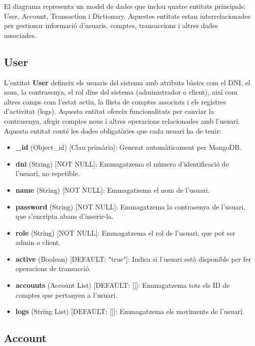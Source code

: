 \documentclass[a4paper,12pt,twoside]{ThesisStyle}
\begin{document}
El diagrama representa un model de dades que inclou quatre entitats principals: User, Account, Transaction i Dictionary. Aquestes entitats estan interrelacionades per gestionar informació d'usuaris, comptes, transaccions i altres dades associades.

\subsection{User}
\label{subsec: User}


L'entitat \textbf{User} defineix els usuaris del sistema amb atributs bàsics com el DNI, el nom, la contrasenya, el rol dins del sistema (administrador o client), així com altres camps com l'estat actiu, la llista de comptes associats i els registres d'activitat (logs). Aquesta entitat ofereix funcionalitats per canviar la contrasenya, afegir comptes nous i altres operacions relacionades amb l'usuari.\\

Aquesta entitat conté les dades obligatòries que cada usuari ha de tenir:

\begin{itemize}
    \item \textbf{\_id} (Object\_id) [Clau primària]: Generat automàticament per MongoDB.
    \item \textbf{dni} (String) [NOT NULL]: Emmagatzema el número d'identificació de l'usuari, no repetible.
    \item \textbf{name} (String) [NOT NULL]: Emmagatzema el nom de l'usuari.
    \item \textbf{password} (String) [NOT NULL]: Emmagatzema la contrasenya de l'usuari, que s'encripta abans d'inserir-la.
    \item \textbf{role} (String) [NOT NULL]: Emmagatzema el rol de l'usuari, que pot ser admin o client.
    \item \textbf{active} (Boolean) [DEFAULT: "true"]: Indica si l'usuari està disponible per fer operacions de transacció.
    \item \textbf{accounts} (Account List) [DEFAULT: []]: Emmagatzema tots els ID de comptes que pertanyen a l'usuari.
    \item \textbf{logs} (String List) [DEFAULT: []]: Emmagatzema els moviments de l'usuari.
\end{itemize}


\subsection{Account}
\label{subsec: Account}
\end{document}
